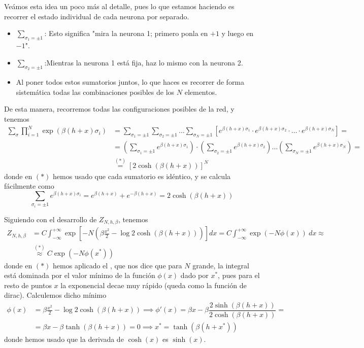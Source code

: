 \noindent
Veámos esta idea un poco más al detalle, pues lo que estamos haciendo es recorrer el estado individual de cada neurona por separado.
\begin{itemize}
    \item $\sum_{\sigma_1 = \pm 1}$: Esto significa "mira la neurona 1; primero ponla en $+1$ y luego en $-1$".
    \item $\sum_{\sigma_2 = \pm 1}$:Mientras la neurona 1 está fija, haz lo mismo con la neurona 2.
    \item Al poner todos estos sumatorios juntos, lo que haces es recorrer de forma sistemática todas las combinaciones posibles de los $N$ elementos.
\end{itemize} 
De esta manera, recorremos todas las configuraciones posibles de la red, y tenemos
\begin{align*}
    \sum_{\sigma} \prod_{i=1}^{N} \exp\left(\beta (h + x) \sigma_i\right)&=\sum_{\sigma_1 = \pm 1} \sum_{\sigma_2 = \pm 1} \dots \sum_{\sigma_N = \pm 1} \left[ e^{\beta(h+x)\sigma_1} \cdot e^{\beta(h+x)\sigma_2} \cdot \dots \cdot e^{\beta(h+x)\sigma_N} \right] = \\
    &= \left( \sum_{\sigma_1 = \pm 1} e^{\beta(h+x)\sigma_1} \right) \cdot \left( \sum_{\sigma_2 = \pm 1} e^{\beta(h+x)\sigma_2} \right) \dots \left( \sum_{\sigma_N = \pm 1} e^{\beta(h+x)\sigma_N} \right) =\\
    &\overset{(*)}{=}[2 \cosh(\beta(h+x))]^N
\end{align*}
donde en $(*)$ hemos usado que cada sumatorio es idéntico, y se calcula fácilmente como
\begin{equation*}
    \sum_{\sigma_i = \pm 1} e^{\beta(h+x)\sigma_i} = e^{\beta(h+x)} + e^{-\beta(h+x)} = 2 \cosh(\beta(h+x))
\end{equation*}

\noindent
Siguiendo con el desarrollo de $Z_{N,h,\beta}$, tenemos
\begin{align*}
    Z_{N,h,\beta} &= C \int_{-\infty}^{+\infty}  \exp \left[ -N \left( \beta \frac{x^2}{2} - \log 2 \cosh(\beta(h + x)) \right) \right] dx=C \int_{-\infty}^{+\infty} \exp(-N\phi(x)) \ dx \approx\\
    &\overset{(*)}{\approx}C \exp(-N\phi(x^*))
\end{align*}
donde en $(*)$ hemos aplicado el , que nos dice que para $N$ grande, la integral está dominada por el valor mínimo de la función $\phi(x)$ dado por $x^*$, pues para el resto de puntos $x$ la exponencial decae muy rápido (queda como la función de dirac). Calculemos dicho mínimo
\begin{align*}
    \phi(x) &= \beta \frac{x^2}{2} - \log 2 \cosh(\beta(h + x)) \implies \phi'(x) = \beta x - \beta \dfrac{2\sinh(\beta(h+x))}{2\cosh(\beta(h+x))} = \\
    &= \beta x - \beta \tanh(\beta(h+x)) = 0 \implies x^* = \tanh(\beta(h+x^*))
\end{align*}
donde hemos usado que la derivada de $\cosh(x)$ es $\sinh(x)$. \\

